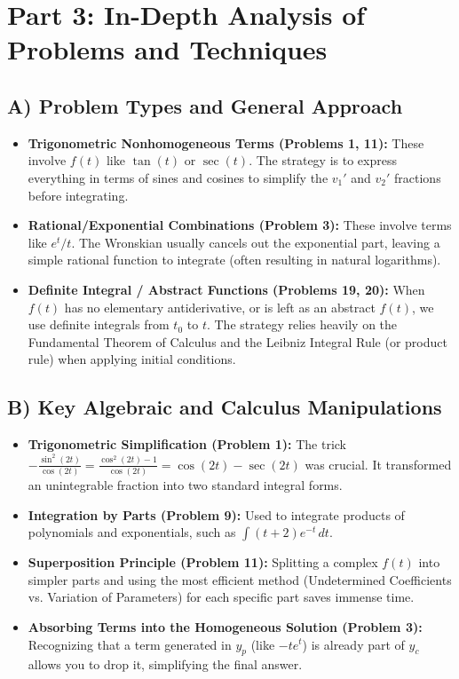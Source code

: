 \documentclass{article}
\begin{document}
\section{Part 3: In-Depth Analysis of Problems and Techniques}

\subsection{A) Problem Types and General Approach}
\begin{itemize}
    \item \textbf{Trigonometric Nonhomogeneous Terms (Problems 1, 11):} These involve $f(t)$ like $\tan(t)$ or $\sec(t)$. The strategy is to express everything in terms of sines and cosines to simplify the $v_1'$ and $v_2'$ fractions before integrating.
    \item \textbf{Rational/Exponential Combinations (Problem 3):} These involve terms like $e^t/t$. The Wronskian usually cancels out the exponential part, leaving a simple rational function to integrate (often resulting in natural logarithms).
    \item \textbf{Definite Integral / Abstract Functions (Problems 19, 20):} When $f(t)$ has no elementary antiderivative, or is left as an abstract $f(t)$, we use definite integrals from $t_0$ to $t$. The strategy relies heavily on the Fundamental Theorem of Calculus and the Leibniz Integral Rule (or product rule) when applying initial conditions.
\end{itemize}

\subsection{B) Key Algebraic and Calculus Manipulations}
\begin{itemize}
    \item \textbf{Trigonometric Simplification (Problem 1):} The trick $-\frac{\sin^2(2t)}{\cos(2t)} = \frac{\cos^2(2t) - 1}{\cos(2t)} = \cos(2t) - \sec(2t)$ was crucial. It transformed an unintegrable fraction into two standard integral forms.
    \item \textbf{Integration by Parts (Problem 9):} Used to integrate products of polynomials and exponentials, such as $\int (t+2)e^{-t} \, dt$.
    \item \textbf{Superposition Principle (Problem 11):} Splitting a complex $f(t)$ into simpler parts and using the most efficient method (Undetermined Coefficients vs. Variation of Parameters) for each specific part saves immense time.
    \item \textbf{Absorbing Terms into the Homogeneous Solution (Problem 3):} Recognizing that a term generated in $y_p$ (like $-t e^t$) is already part of $y_c$ allows you to drop it, simplifying the final answer.
\end{itemize}
\end{document}
